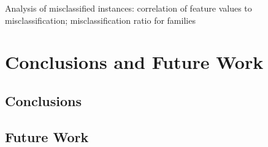 \documentclass{article}
\begin{document}
Analysis of misclassified instances: correlation of feature values to misclassification; misclassification ratio for families

\section{Conclusions and Future Work}
\label{sec:conclusion}

\subsection{Conclusions}

\subsection{Future Work}

\printbibliography
\end{document}
